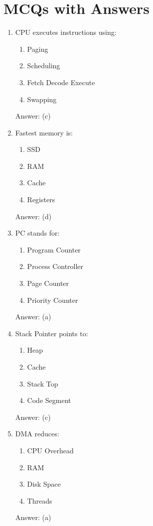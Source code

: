 \section{MCQs with Answers}

\begin{enumerate}
\item CPU executes instructions using:
\begin{enumerate}[label=(\alph*)]
\item Paging
\item Scheduling
\item Fetch Decode Execute
\item Swapping
\end{enumerate}
Answer: (c)

\item Fastest memory is:
\begin{enumerate}[label=(\alph*)]
\item SSD
\item RAM
\item Cache
\item Registers
\end{enumerate}
Answer: (d)

\item PC stands for:
\begin{enumerate}[label=(\alph*)]
\item Program Counter
\item Process Controller
\item Page Counter
\item Priority Counter
\end{enumerate}
Answer: (a)

\item Stack Pointer points to:
\begin{enumerate}[label=(\alph*)]
\item Heap
\item Cache
\item Stack Top
\item Code Segment
\end{enumerate}
Answer: (c)

\item DMA reduces:
\begin{enumerate}[label=(\alph*)]
\item CPU Overhead
\item RAM
\item Disk Space
\item Threads
\end{enumerate}
Answer: (a)


\end{enumerate}
